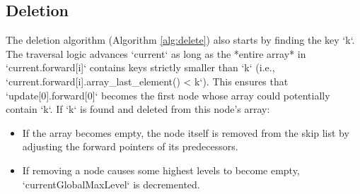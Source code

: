\documentclass[sigconf]{acmart}
\begin{document}
\subsection{Deletion}
The deletion algorithm (Algorithm \ref{alg:delete}) also starts by finding the key `k`. The traversal logic advances `current` as long as the *entire array* in `current.forward[i]` contains keys strictly smaller than `k` (i.e., `current.forward[i].array_last_element() < k`). This ensures that `update[0].forward[0]` becomes the first node whose array could potentially contain `k`.
If `k` is found and deleted from this node's array:
\begin{itemize}
    \item If the array becomes empty, the node itself is removed from the skip list by adjusting the forward pointers of its predecessors.
    \item If removing a node causes some highest levels to become empty, `currentGlobalMaxLevel` is decremented.
\end{itemize}
\end{document}
